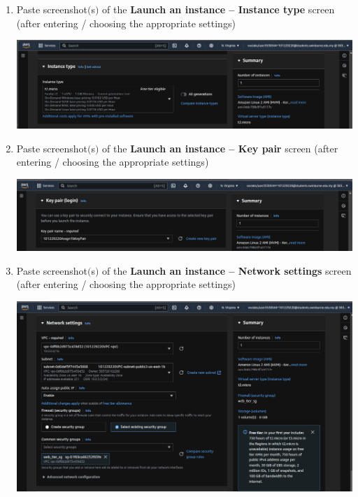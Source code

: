 \documentclass[11pt]{article}
\begin{document}
\begin{enumerate}[resume]
    \item Paste screenshot$($s$)$ of the \textbf{Launch an instance – Instance type} screen (after entering / choosing the appropriate settings) \\
    \vspace{5mm}

    {\centering
    \includegraphics[width=5.8in]{pics/17.png}
    }



    \item Paste screenshot$($s$)$ of the \textbf{Launch an instance – Key pair} screen (after entering / choosing the appropriate settings) \\
    \vspace{5mm}

    {\centering
    \includegraphics[width=5.8in]{pics/18.png}
    }



    \item Paste screenshot$($s$)$ of the \textbf{Launch an instance – Network settings} screen (after entering / choosing the appropriate settings) \\
    \vspace{5mm}

    {\centering
    \includegraphics[width=5.8in]{pics/19.png}
    }



\end{enumerate}
\end{document}
